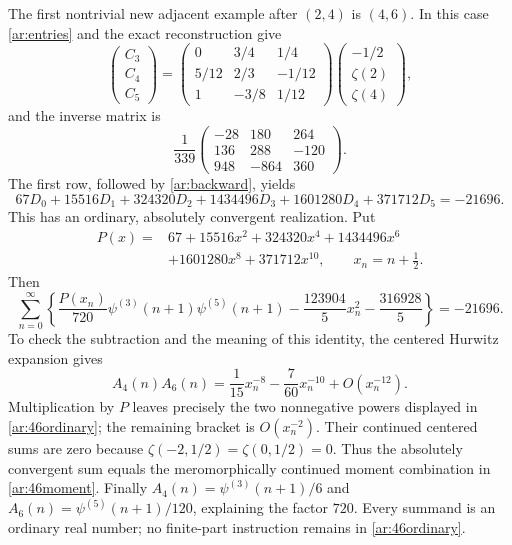 The first nontrivial new adjacent example after $(2,4)$ is $(4,6)$.
In this case \eqref{ar:entries} and the exact reconstruction give
\begin{equation}\label{ar:46matrix}
 \begin{pmatrix}C_3\\C_4\\C_5\end{pmatrix}
 =\begin{pmatrix}
 0&3/4&1/4\\5/12&2/3&-1/12\\1&-3/8&1/12
 \end{pmatrix}
 \begin{pmatrix}-1/2\\\zeta(2)\\\zeta(4)\end{pmatrix},
\end{equation}
and the inverse matrix is
\[
 \frac1{339}
 \begin{pmatrix}-28&180&264\\136&288&-120\\948&-864&360\end{pmatrix}.
\]
The first row, followed by \eqref{ar:backward}, yields
\begin{equation}\label{ar:46moment}
 67D_0+15516D_1+324320D_2+1434496D_3
       +1601280D_4+371712D_5=-21696.
\end{equation}
This has an ordinary, absolutely convergent realization. Put
\[
 \begin{split}
 P(x)={}&67+15516x^2+324320x^4+1434496x^6\\
        &+1601280x^8+371712x^{10},\qquad x_n=n+\tfrac12.
 \end{split}
\]
Then
\begin{equation}\label{ar:46ordinary}
 \boxed{\displaystyle
 \sum_{n=0}^{\infty}\left\{
  \frac{P(x_n)}{720}\psi^{(3)}(n+1)\psi^{(5)}(n+1)
       -\frac{123904}{5}x_n^2-\frac{316928}{5}\right\}=-21696.}
\end{equation}
To check the subtraction and the meaning of this identity, the centered
Hurwitz expansion gives
\[
 A_4(n)A_6(n)
   =\frac1{15}x_n^{-8}-\frac7{60}x_n^{-10}+O(x_n^{-12}).
\]
Multiplication by $P$ leaves precisely the two nonnegative powers
displayed in \eqref{ar:46ordinary}; the remaining bracket is
$O(x_n^{-2})$. Their continued centered sums are zero because
$\zeta(-2,1/2)=\zeta(0,1/2)=0$. Thus the absolutely convergent
sum equals the meromorphically continued moment combination in
\eqref{ar:46moment}. Finally
$A_4(n)=\psi^{(3)}(n+1)/6$ and
$A_6(n)=\psi^{(5)}(n+1)/120$, explaining the factor $720$.
Every summand is an ordinary real number; no finite-part instruction
remains in \eqref{ar:46ordinary}.

